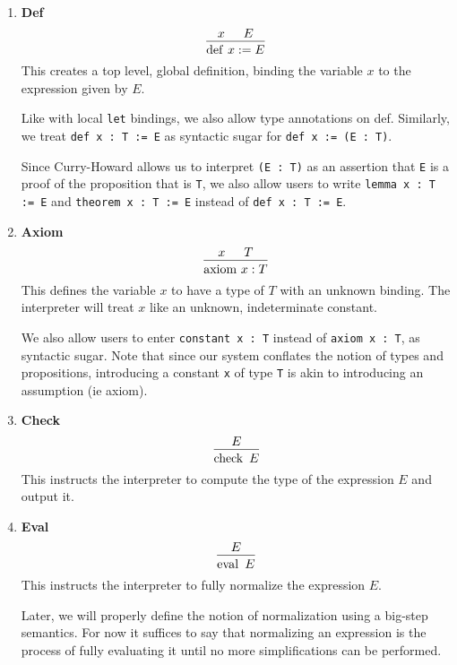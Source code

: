 \documentclass{article}
\begin{document}
\begin{enumerate}
\item \textbf{Def} \\
\[
  \begin{prooftree}
    \hypo{x}
    \hypo{E}
    \infer2{\deff \, x := E}
  \end{prooftree}
\]
This creates a top level, global definition, binding the variable $x$ to the
expression given by $E$.

Like with local \verb|let| bindings, we also allow type annotations on def.
Similarly, we treat \verb|def x : T := E| as syntactic sugar for
\verb|def x := (E : T)|.

Since Curry-Howard allows us to interpret \verb|(E : T)| as an assertion
that \verb|E| is a proof of the proposition that is \verb|T|, we also allow
users to write \verb|lemma x : T := E| and \verb|theorem x : T := E| instead of
\verb|def x : T := E|.

\item \textbf{Axiom} \\
\[
  \begin{prooftree}
    \hypo{x}
    \hypo{T}
    \infer2{\axiom \, x : T}
  \end{prooftree}
\]
This defines the variable $x$ to have a type of $T$ with an unknown binding.
The interpreter will treat $x$ like an unknown, indeterminate constant.

We also allow users to enter \verb|constant x : T| instead of \verb|axiom x : T|,
as syntactic sugar. Note that since our system conflates the notion of types and
propositions, introducing a constant \verb|x| of type \verb|T| is akin to
introducing an assumption (ie axiom).

\item \textbf{Check} \\
\[
  \begin{prooftree}
    \hypo{E}
    \infer1{\checkk \,\, E}
  \end{prooftree}
\]
This instructs the interpreter to compute the type of the expression $E$ and
output it.

\item \textbf{Eval} \\
\[
  \begin{prooftree}
    \hypo{E}
    \infer1{\evall \,\, E}
  \end{prooftree}
\]
This instructs the interpreter to fully normalize the expression $E$.

Later, we will properly define the notion of normalization using a
big-step semantics. For now it suffices to say that normalizing an expression
is the process of fully evaluating it until no more simplifications can be
performed.

\end{enumerate}
\end{document}
